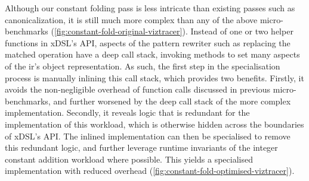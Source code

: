 Although our constant folding pass is less intricate than existing passes such as canonicalization, it is still much more complex than any of the above micro-benchmarks (\autoref{fig:constant-fold-original-viztracer}).
Instead of one or two helper functions in xDSL's API, aspects of the pattern rewriter such as replacing the matched operation have a deep call stack, invoking methods to set many aspects of the \ac{ir}'s object representation.
As such, the first step in the specialisation process is manually inlining this call stack, which provides two benefits. Firstly, it avoids the non-negligible overhead of function calls discussed in previous micro-benchmarks, and further worsened by the deep call stack of the more complex implementation. Secondly, it reveals logic that is redundant for the implementation of this workload, which is otherwise hidden across the boundaries of xDSL's API.
The inlined implementation can then be specialised to remove this redundant logic, and further leverage runtime invariants of the integer constant addition workload where possible.
This yields a specialised implementation with reduced overhead (\autoref{fig:constant-fold-optimised-viztracer}).


